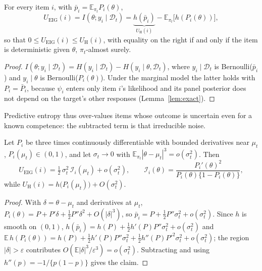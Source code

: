 \begin{proposition}\label{prop:decomp}
For every item $i$, with $\bar p_i=\mathbb E_{\pi_t}P_i(\theta)$,
\begin{equation}
U_{\mathrm{EIG}}(i)= I(\theta;y_i\mid\mathcal D_t)
= \underbrace{h(\bar p_i)}_{U_{\mathrm{H}}(i)} - \mathbb E_{\pi_t}\big[h(P_i(\theta))\big],
\end{equation}
so that $0\le U_{\mathrm{EIG}}(i)\le U_{\mathrm H}(i)$, with equality on the right if and
only if the item is deterministic given $\theta$, $\pi_t$-almost surely.
\end{proposition}

\begin{proof}
$I(\theta;y_i\mid\mathcal D_t)=H(y_i\mid\mathcal D_t)-H(y_i\mid\theta,\mathcal D_t)$, where
$y_i\mid\mathcal D_t$ is Bernoulli($\bar p_i$) and $y_i\mid\theta$ is Bernoulli($P_i(\theta)$).
Under the marginal model the latter holds with $P_i=\bar P_i$, because $\psi_i$ enters only
item $i$'s likelihood and its panel posterior does not depend on the target's other
responses (Lemma~\ref{lem:exact}).
\end{proof}

Predictive entropy thus over-values items whose outcome is uncertain even for a known
competence: the subtracted term is that irreducible noise.

\begin{proposition}\label{prop:local}
Let $P_i$ be three times continuously differentiable with bounded derivatives near $\mu_t$,
$P_i(\mu_t)\in(0,1)$, and let $\sigma_t\to0$ with $\mathbb E_{\pi_t}|\theta-\mu_t|^3=o(\sigma_t^2)$.
Then
\begin{equation}
U_{\mathrm{EIG}}(i)=\tfrac12\,\sigma_t^2\,\mathcal I_i(\mu_t)+o(\sigma_t^2),
\qquad \mathcal I_i(\theta)=\frac{P_i'(\theta)^2}{P_i(\theta)\{1-P_i(\theta)\}},
\end{equation}
while $U_{\mathrm H}(i)=h\big(P_i(\mu_t)\big)+O(\sigma_t^2)$.
\end{proposition}

\begin{proof}
With $\delta=\theta-\mu_t$ and derivatives at $\mu_t$,
$P_i(\theta)=P+P'\delta+\frac12P''\delta^2+O(|\delta|^3)$, so
$\bar p_i=P+\frac12P''\sigma_t^2+o(\sigma_t^2)$. Since $h$ is smooth on $(0,1)$,
$h(\bar p_i)=h(P)+\frac12h'(P)P''\sigma_t^2+o(\sigma_t^2)$ and
$\mathbb E\,h(P_i(\theta))=h(P)+\frac12h'(P)P''\sigma_t^2+\frac12h''(P)P'^2\sigma_t^2+o(\sigma_t^2)$;
the region $|\delta|>\varepsilon$ contributes $O(\mathbb E|\delta|^3/\varepsilon^3)=o(\sigma_t^2)$.
Subtracting and using $h''(p)=-1/\{p(1-p)\}$ gives the claim.
\end{proof}

